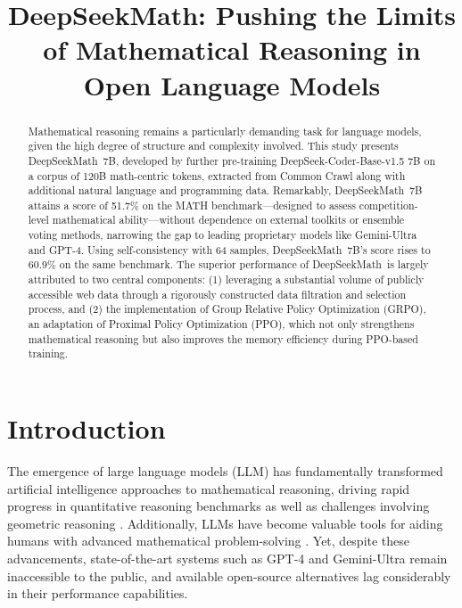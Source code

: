 \title{DeepSeekMath: Pushing the Limits of Mathematical Reasoning in Open Language Models}

\begin{abstract}
Mathematical reasoning remains a particularly demanding task for language models, given the high degree of structure and complexity involved. This study presents DeepSeekMath~7B, developed by further pre-training DeepSeek-Coder-Base-v1.5 7B on a corpus of 120B math-centric tokens, extracted from Common Crawl along with additional natural language and programming data. Remarkably, DeepSeekMath~7B attains a score of 51.7\% on the MATH benchmark—designed to assess competition-level mathematical ability—without dependence on external toolkits or ensemble voting methods, narrowing the gap to leading proprietary models like Gemini-Ultra and GPT-4. Using self-consistency with 64 samples, DeepSeekMath~7B's score rises to 60.9\% on the same benchmark. The superior performance of DeepSeekMath~is largely attributed to two central components: (1) leveraging a substantial volume of publicly accessible web data through a rigorously constructed data filtration and selection process, and (2) the implementation of Group Relative Policy Optimization (GRPO), an adaptation of Proximal Policy Optimization (PPO), which not only strengthens mathematical reasoning but also improves the memory efficiency during PPO-based training.
\end{abstract}

\section{Introduction}

The emergence of large language models (LLM) has fundamentally transformed artificial intelligence approaches to mathematical reasoning, driving rapid progress in quantitative reasoning benchmarks \citep{MATH} as well as challenges involving geometric reasoning \citep{trinh2024solving}. Additionally, LLMs have become valuable tools for aiding humans with advanced mathematical problem-solving \citep{tao}. Yet, despite these advancements, state-of-the-art systems such as GPT-4 \citep{gpt4} and Gemini-Ultra \citep{gemini} remain inaccessible to the public, and available open-source alternatives lag considerably in their performance capabilities.

